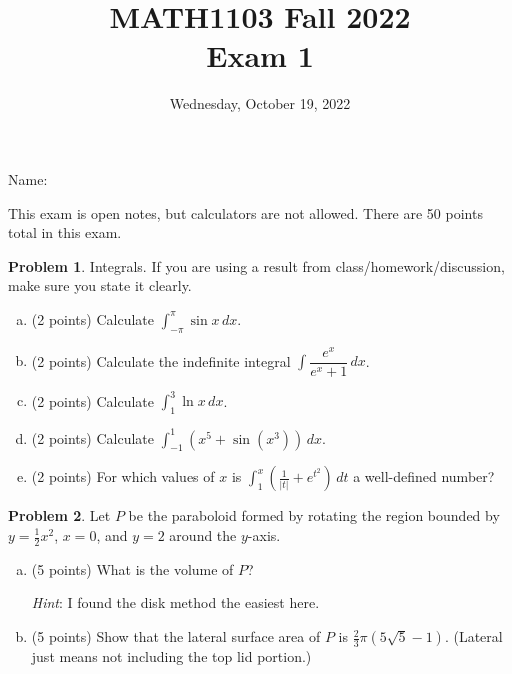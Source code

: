 \documentclass[11pt,oneside]{amsart}
\title{MATH1103 Fall 2022\\
Exam 1}
\author{Wednesday, October 19, 2022}
\theoremstyle{definition}
\newtheorem{problem}{Problem}
\begin{document}
\maketitle

Name: \underline{\hspace{6cm}}

This exam is open notes, but calculators are not allowed. There are 50 points total in this exam.

\begin{problem}
Integrals. If you are using a result from class/homework/discussion, make sure you state it clearly.
\begin{enumerate}[(a)]
    \item (2 points) Calculate $\displaystyle\int_{-\pi}^\pi \sin x\,dx$.
          \vfill
    \item (2 points) Calculate the indefinite integral $\displaystyle\int \dfrac{e^x}{e^x+1}\, dx$.
          \vfill
    \item (2 points) Calculate $\displaystyle\int_1 ^3 \ln x\,dx$.
          \vfill
    \item (2 points) Calculate $\displaystyle\int_{-1}^1 (x^5+\sin(x^3))\,dx$.
          \vfill
    \item (2 points) For which values of $x$ is $\displaystyle\int_1^x\left(\frac 1{|t|}+e^{t^2}\right)\,dt$ a well-defined number?
          \vfill
\end{enumerate}
\end{problem}

\newpage

\begin{problem}
Let $P$ be the paraboloid formed by rotating the region bounded by $y=\frac 12x^2$, $x=0$, and $y=2$ around the $y$-axis.

\begin{enumerate}[(a)]
    \item (5 points) What is the volume of $P$?

          \emph{Hint}: I found the disk method the easiest here.
          \vfill
    \item (5 points) Show that the lateral surface area of $P$  is $\frac 23\pi(5\sqrt 5-1)$. (Lateral just means not including the top lid portion.)
          \vfill
\end{enumerate}
\end{problem}
\end{document}
